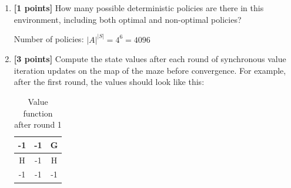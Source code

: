 \documentclass[11pt]{article}
\numberwithin{equation}{section} %
\numberwithin{figure}{section} %
\numberwithin{table}{section} %
\begin{document}
\begin{enumerate}
\item \textbf{[1 points]} How many possible deterministic policies are there in this environment, including both optimal and non-optimal policies?

\begin{tcolorbox}[fit,height=3cm, width=\linewidth, blank, borderline={1pt}{-2pt},nobeforeafter]
    Number of policies: $|A|^{|S|}=4^6=4096$
\end{tcolorbox}


\newpage

\item \textbf{[3 points]} Compute the state values after each round of synchronous value iteration updates on the map of the maze before convergence. For example, after the first round, the values should look like this:

\begin{table}[H]
\begin{center}
  \begin{tabular}{ | c | c | c | }
    \hline
    -1 & -1 & G\\ \hline
    H & -1 & H \\ \hline
    -1 & -1 & -1 \\ \hline
  \end{tabular}
 \caption{Value function after round 1}
\end{center}
\end{table}

\begin{tcolorbox}[fit,height=3.5cm, width=\linewidth, blank, borderline={1pt}{-2pt},nobeforeafter]
    \def\arraystretch{1.5}
    

\end{tcolorbox}
\end{enumerate}
\end{document}
